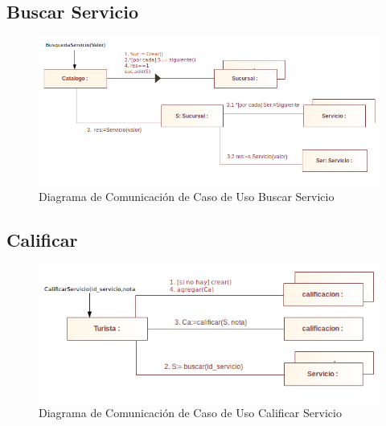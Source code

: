 \documentclass[12pt]{article}
\begin{document}
\subsection{Buscar Servicio}
\begin{center}\begin{figure}[htp]
\centering
\includegraphics[scale=0.55]{Diagramas/Comunicacion/busqueda_servicio.png}
\caption{Diagrama de Comunicación de Caso de Uso Buscar Servicio}
\label{}
\end{figure}\end{center}
\subsection{Calificar}
\begin{center}\begin{figure}[htp]
\centering
\includegraphics[scale=0.60]{Diagramas/Comunicacion/calificar_servicio.png}
\caption{Diagrama de Comunicación de Caso de Uso Calificar Servicio}
\label{}
\end{figure}\end{center}
\newpage
\end{document}
